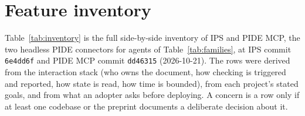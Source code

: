 \documentclass[11pt]{article}
\newcommand{\code}[1]{\colorbox{gray!12}{\texttt{\vphantom{Ag}#1}}}
\begin{document}
\section{Feature inventory}
\label{app:inventory}

Table~\ref{tab:inventory} is the full side-by-side inventory of IPS and
PIDE MCP, the two headless PIDE connectors for agents of
Table~\ref{tab:families},
at IPS commit \code{6e4dd6f} and PIDE MCP commit \code{dd46315}
(2026-10-21). The rows were derived from the interaction stack
(who owns the document, how checking is triggered and reported, how state
is read, how time is bounded), from each project's stated goals, and from
what an adopter asks before deploying. A concern is a row only if at least
one codebase or the preprint documents a deliberate decision about it.
\end{document}

